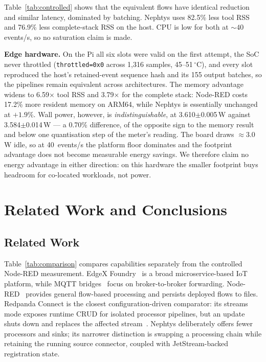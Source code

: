 \documentclass[conference]{IEEEtran}
\begin{document}
Table~\ref{tab:controlled} shows that the equivalent flows have identical reduction and similar latency, dominated by batching. Nephtys uses 82.5\% less tool RSS and 76.9\% less complete-stack RSS on the host. CPU is low for both at ${\sim}40$ events/s, so no saturation claim is made.

\textbf{Edge hardware.} On the Pi all six slots were valid on the first attempt, the SoC never throttled (\texttt{throttled=0x0} across 1,316 samples, 45--51\,$^\circ$C), and every slot reproduced the host's retained-event sequence hash and its 155 output batches, so the pipelines remain equivalent across architectures. The memory advantage widens to 6.59$\times$ tool RSS and 3.79$\times$ for the complete stack: Node-RED costs 17.2\% more resident memory on ARM64, while Nephtys is essentially unchanged at $+1.9\%$. Wall power, however, is \emph{indistinguishable}, at 3.610$\pm$0.005\,W against 3.584$\pm$0.014\,W --- a 0.70\% difference, of the opposite sign to the memory result and below one quantisation step of the meter's reading. The board draws ${\approx}3.0$\,W idle, so at 40~events/s the platform floor dominates and the footprint advantage does not become measurable energy savings. We therefore claim no energy advantage in either direction: on this hardware the smaller footprint buys headroom for co-located workloads, not power.

\section{Related Work and Conclusions}

\subsection{Related Work}

Table~\ref{tab:comparison} compares capabilities separately from the controlled Node-RED measurement. EdgeX Foundry~\cite{edgex2026} is a broad microservice-based IoT platform, while MQTT bridges~\cite{mqtt2019} focus on broker-to-broker forwarding. Node-RED~\cite{nodered2026} provides general flow-based processing and persists deployed flows to files. Redpanda Connect is the closest configuration-driven comparator: its streams mode exposes runtime CRUD for isolated processor pipelines, but an update shuts down and replaces the affected stream~\cite{redpandaconnect2026}. Nephtys deliberately offers fewer processors and sinks; its narrower distinction is swapping a processing chain while retaining the running source connector, coupled with JetStream-backed registration state.
\end{document}
